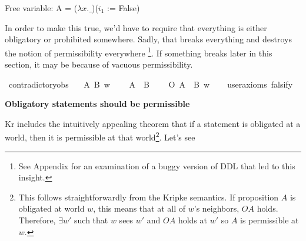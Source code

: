 \begin{isabellebody}
{  Free variable:
    A = ($\lambda x. \_$)($i_1$ := False) \color{black}%
}%
\endisatagproof
{\isafoldproof}%
%
\isadelimproof
%
\endisadelimproof
%
\begin{isamarkuptext}%
In order to make this true, we'd have to require that everything is either obligatory or
prohibited somewhere. Sadly, that breaks everything and destroys the 
notion of permissibility everywhere \footnote{See Appendix for an examination of a buggy version of DDL that led to this insight.}. 
If something breaks later in this section, it may be because of vacuous permissibility.%
\end{isamarkuptext}\isamarkuptrue%
\isamarkupfalse%
\ contradictory{\isacharunderscore}obs{\isacharcolon}\isanewline
\ \ \ A\ B\ w\isanewline
\ \ \ {\isachardoublequoteopen}{\isasymTurnstile}\ {\isacharparenleft}A\ \isactrlbold {\isasymand}\ B{\isacharparenright}{\isachardoublequoteclose}\isanewline
\ \ \ {\isachardoublequoteopen}{\isacharparenleft}\isactrlbold {\isasymnot}\ {\isacharparenleft}O\ {\isacharbraceleft}A\ \isactrlbold {\isasymand}\ B{\isacharbraceright}{\isacharparenright}{\isacharparenright}\ w{\isachardoublequoteclose}\isanewline
\ \ \isamarkupfalse%
\ {\isacharbrackleft}user{\isacharunderscore}axioms{\isacharcomma}\ falsify{\isacharbrackright}%
\isadelimproof
\ %
\endisadelimproof
%
\isatagproof
{}\isamarkupfalse%
\isanewline
%
%
\endisatagproof
{\isafoldproof}%
%
\isadelimproof
%
\endisadelimproof
%
\begin{isamarkuptext}%
\textbf{Obligatory statements should be permissible}%
\end{isamarkuptext}\isamarkuptrue%
%
\begin{isamarkuptext}%
Kr includes the intuitively appealing theorem that if a statement is obligated at a world, then it 
is permissible at that world\footnote{This follows straightforwardly from the Kripke semantics. If proposition $A$ is 
obligated at world $w$, this means that at all of $w$'s neighbors, $O A$ holds. Therefore, 
$\exists w'$ such that $w$ sees $w'$ and $O A$ holds at $w'$ so $A$ is permissible at $w$.}. Let's see 

\end{isamarkuptext}
\end{isabellebody}
